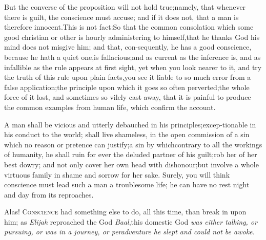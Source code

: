 \documentclass{article}
\begin{document}
\begin{story}{But the converse of the proposition}
will not hold
true;\tsh namely, that whenever there is guilt, the conscience
must accuse; and if it does not, that a man is therefore
innocent.\tsh This is not fact:\tsk So that the
common consolation which some good christian or other is hourly
administering to himself,\tsk that he thanks God his mind does
not misgive him; and that, con-\pb sequently, he has a good conscience,
because he hath a quiet one,\tsk is fallacious;\tsk and as
current as the inference is, and as infallible as the rule appears
at first sight, yet when you look nearer to it, and try the truth
of this rule upon plain facts,\tsk you see it liable to so
much error from a false application;\tsk the principle
upon which it goes so often perverted;\tsk the whole force
of it lost, and sometimes so vilely cast away, that it is painful
to produce the common examples from human life, which confirm the
account.
\end{story}
\vspace\parskip

\begin{story}{A man shall be vicious and utterly} debauched in his
principles;\tsk excep-\break tionable in his conduct to the world; shall live
shameless, in the open commission of a sin which no reason or pretence can
justify;\tsh a sin by which\pb contrary to all the workings of humanity,
he shall ruin for ever the deluded partner of his guilt;\tsk rob her of her
best dowry; and not only cover her own head with dishonour;\tsk but involve a
whole virtuous family in shame and sorrow for her sake. Surely, you will think
conscience must lead such a man a troublesome life; he can have no rest night
and day from its reproaches.
\end{story}
\vspace\parskip

\begin{story}{Alas! \textsc{Conscience} had something}
    else to do, all this time, than break in upon him;
    as \textit{Elijah} reproached the God
    \textit{Baal},\tsh this domestic God \textit{was
    either talking, or pursuing, or was in a journey, or
    peradventure he slept and could not be awoke.}
\end{story}
\vspace\parskip
\end{document}
